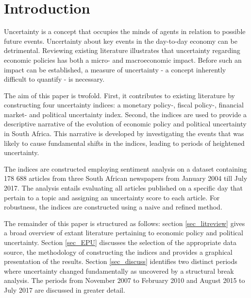 \documentclass[11pt,preprint, authoryear]{elsarticle}
\numberwithin{equation}{section}
\numberwithin{figure}{section}
\numberwithin{table}{section}
\begin{document}

\headsep 35pt %




\section{\texorpdfstring{Introduction
\label{sec_intro}}{Introduction }}\label{introduction}

Uncertainty is a concept that occupies the minds of agents in relation
to possible future events. Uncertainty about key events in the
day-to-day economy can be detrimental. Reviewing existing literature
illustrates that uncertainty regarding economic policies has both a micro- and
macroeconomic impact. Before such an impact can be established, a measure of uncertainty - a concept inherently difficult to quantify - is necessary. 

The aim of this paper is twofold. First, it contributes to existing literature by constructing four uncertainty indices: a monetary policy-, fiscal policy-, financial market- and political uncertainty index. Second, the indices are used to provide a descriptive narrative of the evolution of economic policy and political uncertainty in South Africa. This narrative is developed by investigating the events that was likely to cause fundamental shifts in the indices, leading to periods of heightened uncertainty.

The indices are constructed employing sentiment analysis on a dataset
containing 178 688 articles from three South African newspapers from January 2004 till July 2017. The analysis entails evaluating all articles published on a specific day that pertain to a topic and assigning an uncertainty score to each article. For robustness, the indices are constructed using a naive and refined method.

The remainder of this paper is structured as follows: section \ref{sec_litreview} gives a broad overview of extant literature pertaining to economic policy and political uncertainty. Section \ref{sec_EPU} discusses the selection of the appropriate data source, the methodology of constructing the indices and provides a graphical presentation of the results. Section \ref{sec_discuss} identifies two distinct periods where uncertainty changed fundamentally as uncovered by a structural break analysis. The periods from November 2007 to February 2010 and August 2015 to July 2017 are discussed in greater detail. 
\end{document}

